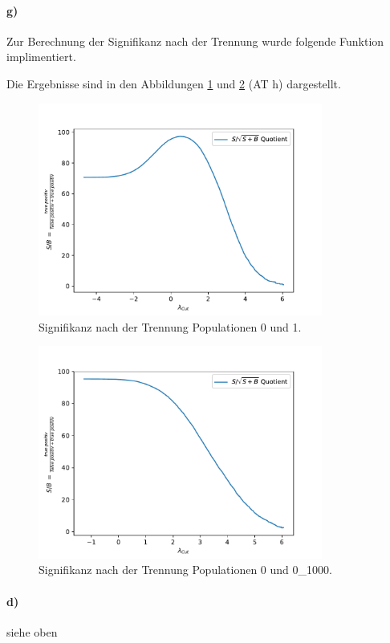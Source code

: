 \paragraph{g)}
Zur Berechnung der Signifikanz nach der Trennung wurde folgende Funktion implimentiert. 

Die Ergebnisse sind in den Abbildungen \ref{fig:S1} und \ref{fig:S2} (AT h) dargestellt. 
\begin{figure}
  \centering
  \includegraphics[height = 7cm]{plots/Signifikanzplot.pdf}
  \caption{Signifikanz nach der Trennung Populationen 0 und 1.}
  \label{fig:S1}
\end{figure}
\begin{figure}
  \centering
  \includegraphics[height = 7cm]{plots/2Signifikanzplot.pdf}
  \caption{Signifikanz nach der Trennung Populationen 0 und 0\_1000.}
  \label{fig:S2}
\end{figure}
\FloatBarrier
\paragraph{d)} siehe oben
